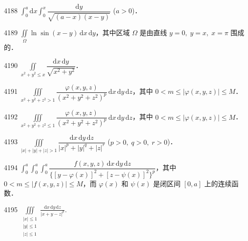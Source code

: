 \begin{prob}[S]{4188}
$\displaystyle\int_0^a \mathrm{d}x \int_0^x \dfrac{\mathrm{d}y}{\sqrt{(a - x)(x - y)}}$ ($a > 0$)．
\end{prob}

\begin{prob}[S]{4189}
$\displaystyle\iint\limits_{\Omega} \ln\sin(x - y) \,\mathrm{d}x\,\mathrm{d}y$，其中区域 $\Omega$ 是由直线 $y = 0,\; y = x,\; x = \pi$ 围成的．
\end{prob}

\begin{prob}[S]{4190}
$\displaystyle\iint\limits_{x^2+y^2 \leqslant x} \dfrac{\mathrm{d}x\,\mathrm{d}y}{\sqrt{x^2 + y^2}}$．
\end{prob}


\begin{prob}[S]{4191}
$\displaystyle\iiint\limits_{x^2+y^2+z^2 > 1} \dfrac{\varphi(x,y,z)}{(x^2 + y^2 + z^2)^p} \,\mathrm{d}x\,\mathrm{d}y\,\mathrm{d}z$，其中 $0 < m \leqslant |\varphi(x,y,z)| \leqslant M$．
\end{prob}

\begin{prob}[S]{4192}
$\displaystyle\iiint\limits_{x^2+y^2+z^2 \leqslant 1} \dfrac{\varphi(x,y,z)}{(x^2 + y^2 + z^2)^p} \,\mathrm{d}x\,\mathrm{d}y\,\mathrm{d}z$，其中 $0 < m \leqslant |\varphi(x,y,z)| \leqslant M$．
\end{prob}

\begin{prob}[S]{4193}
$\displaystyle\iiint\limits_{|x|+|y|+|z| > 1} \dfrac{\mathrm{d}x\,\mathrm{d}y\,\mathrm{d}z}{|x|^p + |y|^q + |z|^r}$ ($p > 0,\; q > 0,\; r > 0$)．
\end{prob}

\begin{prob}[M]{4194}
$\displaystyle\int_0^a \int_0^a \int_0^a \dfrac{f(x,y,z) \,\mathrm{d}x\,\mathrm{d}y\,\mathrm{d}z}{\{[y - \varphi(x)]^2 + [z - \psi(x)]^2\}^p}$，其中 $0 < m \leqslant |f(x,y,z)| \leqslant M$，而 $\varphi(x)$ 和 $\psi(x)$ 是闭区间 $[0, a]$ 上的连续函数．
\end{prob}

\begin{prob}[S]{4195}
$\displaystyle \iiint\limits_{\substack{|x|\leqslant 1 \\ |y|\leqslant 1 \\ |z|\leqslant 1}} \frac{\mathrm{d}x\,\mathrm{d}y\,\mathrm{d}z}{|x+y-z|^p}$.
\end{prob}

